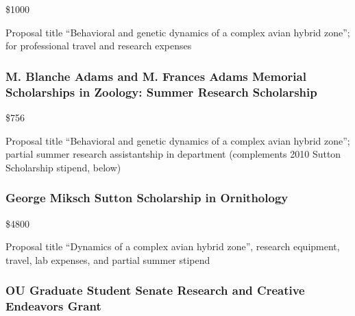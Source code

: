 \documentclass[
  letterpaper,
  DIV=11,
  numbers=noendperiod,
  oneside]{scrreprt}
\begin{document}
\$1000


Proposal title ``Behavioral and genetic dynamics of a complex avian
hybrid zone''; for professional travel and research expenses

\subsubsection{M. Blanche Adams and M. Frances Adams Memorial
Scholarships in Zoology: Summer Research
Scholarship}\label{m.-blanche-adams-and-m.-frances-adams-memorial-scholarships-in-zoology-summer-research-scholarship-2}

\$756


Proposal title ``Behavioral and genetic dynamics of a complex avian
hybrid zone''; partial summer research assistantship in department
(complements 2010 Sutton Scholarship stipend, below)

\subsubsection{George Miksch Sutton Scholarship in
Ornithology}\label{george-miksch-sutton-scholarship-in-ornithology-2}

\$4800


Proposal title ``Dynamics of a complex avian hybrid zone'', research
equipment, travel, lab expenses, and partial summer stipend

\subsubsection{OU Graduate Student Senate Research and Creative
Endeavors
Grant}\label{ou-graduate-student-senate-research-and-creative-endeavors-grant}
\end{document}
